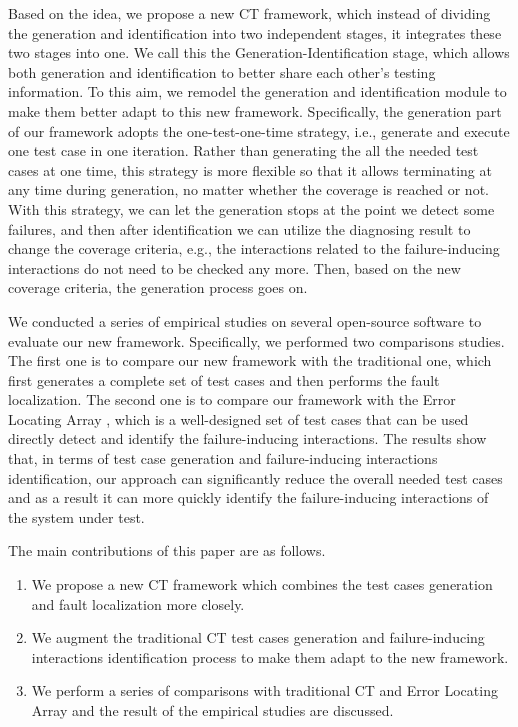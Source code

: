 \documentclass{sig-alternate}
\begin{document}
Based on the idea, we propose a new CT framework, which instead of dividing the generation and identification into two independent stages, it integrates these two stages into one. We call this the Generation-Identification stage, which allows both generation and identification to better share each other's testing information. To this aim, we remodel the generation and identification module to make them better adapt to this new framework. Specifically, the generation part of our framework adopts the one-test-one-time strategy, i.e., generate and execute one test case in one iteration. Rather than generating the all the needed test cases at one time, this strategy is more flexible so that it allows terminating at any time during generation, no matter whether the coverage is reached or not. With this strategy, we can let the generation stops at the point we detect some failures, and then after identification we can utilize the diagnosing result to change the coverage criteria, e.g., the interactions related to the failure-inducing interactions do not need to be checked any more. Then, based on the new coverage criteria, the generation process goes on.


We conducted a series of empirical studies on several open-source software to evaluate our new framework. Specifically, we performed two comparisons studies. The first one is to compare our new framework with the traditional one, which first generates a complete set of test cases and then performs the fault localization. The second one is to compare our framework with the Error Locating Array \cite{martinez2008algorithms,martinez2009locating}, which is a well-designed set of test cases that can be used directly detect and identify the failure-inducing interactions. The results show that, in terms of test case generation and failure-inducing interactions identification, our approach can significantly reduce the overall needed test cases and as a result it can more quickly identify the failure-inducing interactions of the system under test.

The main contributions of this paper are as follows.

 \begin{enumerate}
 \item  We propose a new CT framework which combines the test cases generation and fault localization more closely.
 \item  We augment the traditional CT test cases generation and failure-inducing interactions identification process to make them adapt to the new framework.
 \item We perform a series of comparisons with traditional CT and Error Locating Array and the result of the empirical studies are discussed.
\end{enumerate}
\end{document}
